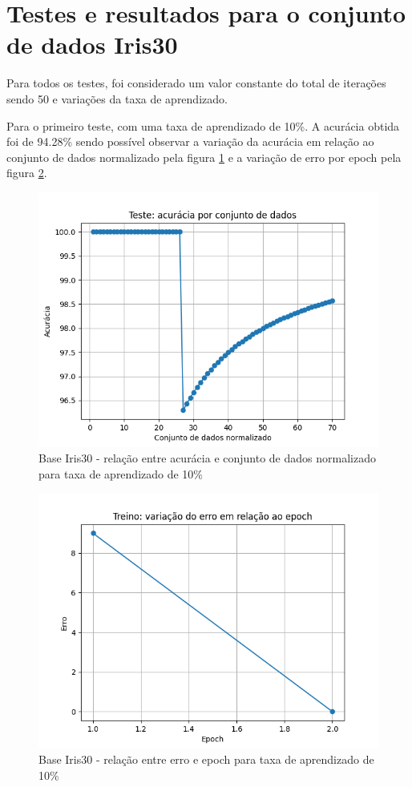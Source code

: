 \documentclass[12pt, %
openright, 
oneside, %
a4paper,    %
brazil]{facom-ufu-abntex2}
\begin{document}
\section{Testes e resultados para o conjunto de dados Iris30}
Para todos os testes, foi considerado um valor constante do total de iterações sendo 50 e variações da taxa de aprendizado.

Para o primeiro teste, com uma taxa de aprendizado de 10\%. A acurácia obtida foi de 94.28\% sendo possível observar a variação da acurácia em relação ao conjunto de dados normalizado pela figura \ref{fig:7} e a variação de erro por epoch pela figura \ref{fig:8}.

\begin{figure}[H]
\centering
\includegraphics[scale=0.9]{figuras/acuracia_4.png}
\caption{Base Iris30 - relação entre acurácia e conjunto de dados normalizado para taxa de aprendizado de 10\%}
\label{fig:7}
\end{figure}

\begin{figure}[H]
\centering
\includegraphics[scale=0.9]{figuras/erro_4.png}
\caption{Base Iris30 - relação entre erro e epoch para taxa de aprendizado de 10\%}
\label{fig:8}
\end{figure}
\end{document}
